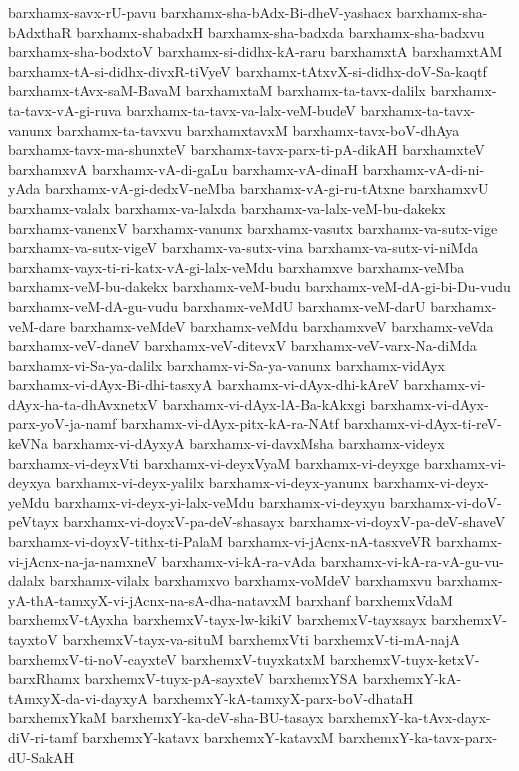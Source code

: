 {barxhamx-savx-rU-pavu
barxhamx-sha-bAdx-Bi-dheV-yashacx
barxhamx-sha-bAdxthaR
barxhamx-shabadxH
barxhamx-sha-badxda
barxhamx-sha-badxvu
barxhamx-sha-bodxtoV
barxhamx-si-didhx-kA-raru
barxhamxtA
barxhamxtAM
barxhamx-tA-si-didhx-divxR-tiVyeV
barxhamx-tAtxvX-si-didhx-doV-Sa-kaqtf
barxhamx-tAvx-saM-BavaM
barxhamxtaM
barxhamx-ta-tavx-dalilx
barxhamx-ta-tavx-vA-gi-ruva
barxhamx-ta-tavx-va-lalx-veM-budeV
barxhamx-ta-tavx-vanunx
barxhamx-ta-tavxvu
barxhamxtavxM
barxhamx-tavx-boV-dhAya
barxhamx-tavx-ma-shunxteV
barxhamx-tavx-parx-ti-pA-dikAH
barxhamxteV
barxhamxvA
barxhamx-vA-di-gaLu
barxhamx-vA-dinaH
barxhamx-vA-di-ni-yAda
barxhamx-vA-gi-dedxV-neMba
barxhamx-vA-gi-ru-tAtxne
barxhamxvU
barxhamx-valalx
barxhamx-va-lalxda
barxhamx-va-lalx-veM-bu-dakekx
barxhamx-vanenxV
barxhamx-vanunx
barxhamx-vasutx
barxhamx-va-sutx-vige
barxhamx-va-sutx-vigeV
barxhamx-va-sutx-vina
barxhamx-va-sutx-vi-niMda
barxhamx-vayx-ti-ri-katx-vA-gi-lalx-veMdu
barxhamxve
barxhamx-veMba
barxhamx-veM-bu-dakekx
barxhamx-veM-budu
barxhamx-veM-dA-gi-bi-Du-vudu
barxhamx-veM-dA-gu-vudu
barxhamx-veMdU
barxhamx-veM-darU
barxhamx-veM-dare
barxhamx-veMdeV
barxhamx-veMdu
barxhamxveV
barxhamx-veVda
barxhamx-veV-daneV
barxhamx-veV-ditevxV
barxhamx-veV-varx-Na-diMda
barxhamx-vi-Sa-ya-dalilx
barxhamx-vi-Sa-ya-vanunx
barxhamx-vidAyx
barxhamx-vi-dAyx-Bi-dhi-tasxyA
barxhamx-vi-dAyx-dhi-kAreV
barxhamx-vi-dAyx-ha-ta-dhAvxnetxV
barxhamx-vi-dAyx-lA-Ba-kAkxgi
barxhamx-vi-dAyx-parx-yoV-ja-namf
barxhamx-vi-dAyx-pitx-kA-ra-NAtf
barxhamx-vi-dAyx-ti-reV-keVNa
barxhamx-vi-dAyxyA
barxhamx-vi-davxMsha
barxhamx-videyx
barxhamx-vi-deyxVti
barxhamx-vi-deyxVyaM
barxhamx-vi-deyxge
barxhamx-vi-deyxya
barxhamx-vi-deyx-yalilx
barxhamx-vi-deyx-yanunx
barxhamx-vi-deyx-yeMdu
barxhamx-vi-deyx-yi-lalx-veMdu
barxhamx-vi-deyxyu
barxhamx-vi-doV-peVtayx
barxhamx-vi-doyxV-pa-deV-shasayx
barxhamx-vi-doyxV-pa-deV-shaveV
barxhamx-vi-doyxV-tithx-ti-PalaM
barxhamx-vi-jAcnx-nA-tasxveVR
barxhamx-vi-jAcnx-na-ja-namxneV
barxhamx-vi-kA-ra-vAda
barxhamx-vi-kA-ra-vA-gu-vu-dalalx
barxhamx-vilalx
barxhamxvo
barxhamx-voMdeV
barxhamxvu
barxhamx-yA-thA-tamxyX-vi-jAcnx-na-sA-dha-natavxM
barxhanf
barxhemxVdaM
barxhemxV-tAyxha
barxhemxV-tayx-lw-kikiV
barxhemxV-tayxsayx
barxhemxV-tayxtoV
barxhemxV-tayx-va-situM
barxhemxVti
barxhemxV-ti-mA-najA
barxhemxV-ti-noV-cayxteV
barxhemxV-tuyxkatxM
barxhemxV-tuyx-ketxV-barxRhamx
barxhemxV-tuyx-pA-sayxteV
barxhemxYSA
barxhemxY-kA-tAmxyX-da-vi-dayxyA
barxhemxY-kA-tamxyX-parx-boV-dhataH
barxhemxYkaM
barxhemxY-ka-deV-sha-BU-tasayx
barxhemxY-ka-tAvx-dayx-diV-ri-tamf
barxhemxY-katavx
barxhemxY-katavxM
barxhemxY-ka-tavx-parx-dU-SakAH
}
